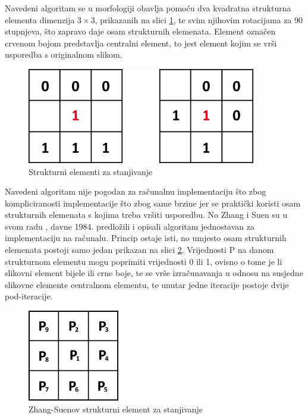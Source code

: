 Navedeni algoritam se u morfologiji obavlja pomoću dva kvadratna strukturna elementa dimenzija $3 \times 3$, prikazanih na slici \ref{fig:thinning_el}, te svim njihovim rotacijama za 90 stupnjeva, što zapravo daje osam strukturnih elemenata. Element označen crvenom bojom predstavlja centralni element, to jest element kojim se vrši usporedba s originalnom slikom.
\begin{figure}[htb]
    \centering
    \includegraphics[width=10cm]{images/thinning_el.jpg}
    \caption{Strukturni elementi za stanjivanje}
    \label{fig:thinning_el}
\end{figure}

Navedeni algoritam nije pogodan za računalnu implementaciju što zbog kompliciranosti implementacije što zbog same brzine jer se praktički koristi osam strukturnih elemenata s kojima treba vršiti usporedbu. No Zhang i Suen su u svom radu \citep{Zhang-Suen}, davne 1984. predložili i opisali algoritam jednostavan za implementaciju na računalu. Princip ostaje isti, no umjesto osam strukturnih elemenata postoji samo jedan prikazan na slici \ref{fig:thinning_el_zhang}. Vrijednosti P na danom strukturnom elementu mogu poprimiti vrijednosti 0 ili 1, ovisno o tome je li slikovni element bijele ili crne boje, te se vrše izračunavanja u odnosu na susjedne slikovne elemente centralnom elementu, te unutar jedne iteracije postoje dvije pod-iteracije.

\begin{figure}[htb]
    \centering
    \includegraphics[width=4cm]{images/kernel.jpg}
    \caption{Zhang-Suenov strukturni element za stanjivanje}
    \label{fig:thinning_el_zhang}
\end{figure}


